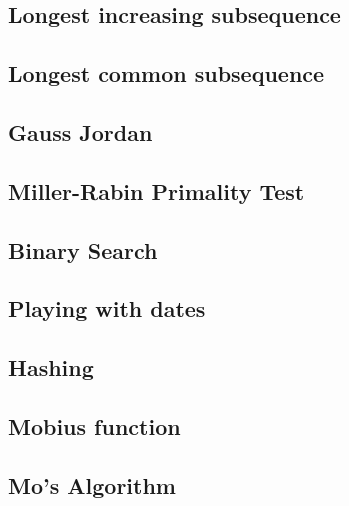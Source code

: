 \subsection{Longest increasing subsequence}
\raggedbottom
\hrulefill
\subsection{Longest common subsequence}
\raggedbottom
\hrulefill
\subsection{Gauss Jordan}
\raggedbottom
\hrulefill
\subsection{Miller-Rabin Primality Test}
\raggedbottom
\hrulefill
\subsection{Binary Search}
\raggedbottom
\hrulefill
\subsection{Playing with dates}
\raggedbottom
\hrulefill
\subsection{Hashing}
\raggedbottom
\hrulefill
\subsection{Mobius function}
\raggedbottom
\hrulefill
\subsection{Mo's Algorithm}
\raggedbottom
\hrulefill


